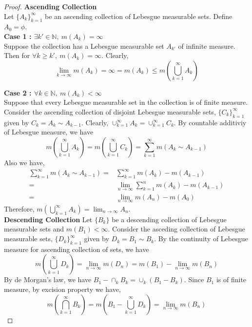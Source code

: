 \begin{proof}
	\textbf{Ascending Collection}\\
	Let $\{ A_k \}_{k=1}^\infty$ be an ascending collection of Lebesgue measurable sets. Define $A_0 = \phi$.\\

	\textbf{Case 1 : $\exists k' \in \mathbb{N},\ m(A_k) = \infty$}\\
	Suppose the collection has a Lebesgue measurable set $A_{k'}$ of infinite measure.
	Then for $\forall k \ge k',\ m(A_k) = \infty$.
	Clearly,
	\begin{equation*}
		\lim_{k \to \infty} m(A_k) = \infty = m(A_k) \le m \left( \bigcup_{k=1}^\infty A_k \right)
	\end{equation*}

	\textbf{Case 2 : $\forall k \in \mathbb{N},\ m(A_k) < \infty$}\\
	Suppose that every Lebesgue measurable set in the collection is of finite measure.
	Consider the ascending collection of disjoint Lebesgue measurable sets, $\{ C_k \}_{k=1}^\infty$ given by $C_k = A_k \sim A_{k-1}$.
	Clearly, $\cup_{k=1}^\infty A_k = \cup_{k=1}^\infty C_k$.
	By countable additiviy of Lebesgue measure, we have 
	\begin{equation*}
		m\left( \bigcup_{k=1}^\infty A_k \right) = m \left( \bigcup_{k=1}^\infty C_k \right) = \sum_{k=1}^\infty m(A_k \sim A_{k-1} )
	\end{equation*}
	Also we have,
	\begin{align*}
		\sum_{k=1}^\infty m(A_k \sim A_{k-1}) = & \sum_{k=1}^\infty m(A_k) - m(A_{k-1})  \\
		= & \lim_{n \to \infty} \sum_{k=1}^n m(A_k) - m(A_{k-1}) \\
		= & \lim_{n \to \infty} m(A_n) - m(A_0)
	\end{align*}
	Therefore, $\displaystyle m\left(\bigcup_{k=1}^\infty A_k \right) = \lim_{n \to \infty} A_n$.\\

	\textbf{Descending Collection}
	Let $\{ B_k \}$ be a descending collection of Lebesgue measurable sets and $m(B_1) < \infty$.
	Consider the asceding collection of Lebesgue measurable sets, $\{ D_k \}_{k=1}^\infty$ given by $D_k = B_1 \sim B_k$.
	By the continuity of Lebesgue measure for ascending collection of sets, we have
	\begin{equation*}
		m\left( \bigcup_{k=1}^\infty D_k \right) = \lim_{n \to \infty} m(D_n) = m(B_1) - \lim_{n \to \infty} m(B_n)
	\end{equation*}
	By de Morgan's law, we have $ B_1 - \cap_k B_k = \cup_k (B_1-B_k)$.
	Since $B_1$ is of finite measure, by excision property we have,
	\[ m \left( \bigcap_{k=1}^\infty B_k \right) = m \left(B_1 - \bigcup_{k=1}^\infty D_k \right) = \lim_{n \to \infty} m(B_n) \]
\end{proof}
